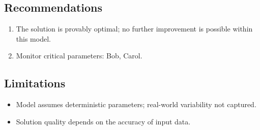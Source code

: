 \documentclass[11pt, a4paper]{article}
\begin{document}

\subsection{Recommendations}

\begin{enumerate}
  \item The solution is provably optimal; no further improvement is possible within this model.
  \item Monitor critical parameters: Bob, Carol.
\end{enumerate}

\subsection{Limitations}

\begin{polyawarnbox}
\begin{itemize}
  \item Model assumes deterministic parameters; real-world variability not captured.
  \item Solution quality depends on the accuracy of input data.
\end{itemize}
\end{polyawarnbox}

\end{document}
